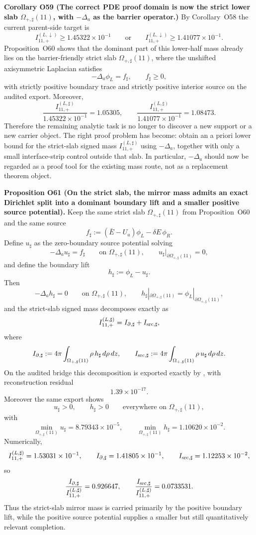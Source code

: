 \documentclass[aps,prd,onecolumn,notitlepage,nofootinbib,superscriptaddress,11pt,floatfix]{revtex4-2}
\begin{document}
\medskip\noindent\textbf{Corollary O59 (The correct PDE proof domain is now the strict lower slab \(\Omega_{+,\sharp}(11)\), with \(-\Delta_a\) as the barrier operator.)}
By Corollary~O58 the current parent-side target is
\[
I_{11,+}^{(L,\downarrow)}\ge 1.45322\times10^{-1}
\qquad\text{or}\qquad
I_{11,+}^{(L,\downarrow)}\ge 1.41077\times10^{-1}.
\]
Proposition~O60 shows that the dominant part of this lower-half mass already lies on the barrier-friendly strict slab \(\Omega_{+,\sharp}(11)\), where the unshifted axisymmetric Laplacian satisfies
\[
-\Delta_a\phi_L=f_\sharp,\qquad f_\sharp\ge 0,
\]
with strictly positive boundary trace and strictly positive interior source on the audited export.  Moreover,
\[
\frac{I_{11,+}^{(L,\sharp)}}{1.45322\times10^{-1}}=1.05305,
\qquad
\frac{I_{11,+}^{(L,\sharp)}}{1.41077\times10^{-1}}=1.08473.
\]
Therefore the remaining analytic task is no longer to discover a new support or a new carrier object.  The right proof problem has become: obtain an a priori lower bound for the strict-slab signed mass \(I_{11,+}^{(L,\sharp)}\) using \(-\Delta_a\), together with only a small interface-strip control outside that slab.  In particular, \(-\Delta_a\) should now be regarded as a proof tool for the existing mass route, not as a replacement theorem object.

\medskip\noindent\textbf{Proposition O61 (On the strict slab, the mirror mass admits an exact Dirichlet split into a dominant boundary lift and a smaller positive source potential).}
Keep the same strict slab \(\Omega_{+,\sharp}(11)\) from Proposition~O60 and the same source
\[
f_\sharp:=(\bar E-U_a)\phi_L-\delta E\,\phi_R.
\]
Define \(u_\sharp\) as the zero-boundary source potential solving
\[
-\Delta_a u_\sharp=f_\sharp
\qquad\text{on }\Omega_{+,\sharp}(11),
\qquad
u_\sharp|_{\partial\Omega_{+,\sharp}(11)}=0,
\]
and define the boundary lift
\[
h_\sharp:=\phi_L-u_\sharp.
\]
Then
\[
-\Delta_a h_\sharp=0
\qquad\text{on }\Omega_{+,\sharp}(11),
\qquad
h_\sharp|_{\partial\Omega_{+,\sharp}(11)}=\phi_L|_{\partial\Omega_{+,\sharp}(11)},
\]
and the strict-slab signed mass decomposes exactly as
\[
I_{11,+}^{(L,\sharp)}
=
I_{\partial,\sharp}+I_{{\rm src},\sharp},
\]
where
\[
I_{\partial,\sharp}
:=
4\pi\int_{\Omega_{+,\sharp}(11)} \rho\,h_\sharp\,d\rho\,dz,
\qquad
I_{{\rm src},\sharp}
:=
4\pi\int_{\Omega_{+,\sharp}(11)} \rho\,u_\sharp\,d\rho\,dz.
\]
On the audited bridge this decomposition is exported exactly by
,
with reconstruction residual
\[
1.39\times10^{-17}.
\]
Moreover the same export shows
\[
u_\sharp>0,
\qquad
h_\sharp>0
\qquad\text{everywhere on }\Omega_{+,\sharp}(11),
\]
with
\[
\min_{\Omega_{+,\sharp}(11)} u_\sharp
=
8.79343\times10^{-5},
\qquad
\min_{\Omega_{+,\sharp}(11)} h_\sharp
=
1.10620\times10^{-2}.
\]
Numerically,
\[
I_{11,+}^{(L,\sharp)}=1.53031\times10^{-1},
\qquad
I_{\partial,\sharp}=1.41805\times10^{-1},
\qquad
I_{{\rm src},\sharp}=1.12253\times10^{-2},
\]
so
\[
\frac{I_{\partial,\sharp}}{I_{11,+}^{(L,\sharp)}}=0.926647,
\qquad
\frac{I_{{\rm src},\sharp}}{I_{11,+}^{(L,\sharp)}}=0.0733531.
\]
Thus the strict-slab mirror mass is carried primarily by the positive boundary lift, while the positive source potential supplies a smaller but still quantitatively relevant completion.
\end{document}
